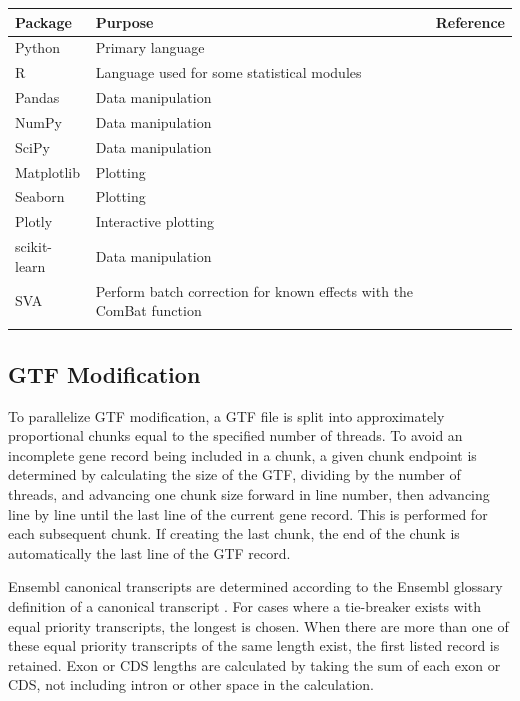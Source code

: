 \documentclass[10pt, oneside]{article}
\begin{document}
\begin{table}[!]
    \centering
{}
\begin{tabular}{p{2.4cm}p{7.5cm}p{3cm}}
 \textbf{Package} & \textbf{Purpose} & \textbf{Reference} \\
 \hline
 Python & Primary language & \\
 \hline
 R & Language used for some statistical modules & \\
 \hline
 Pandas & Data manipulation & \cite{pandas} \\
 \hline
 NumPy & Data manipulation & \cite{numpy1, numpy2} \\
 \hline
 SciPy & Data manipulation & \cite{scipy} \\
 \hline
 Matplotlib & Plotting & \cite{matplotlib} \\
 \hline
 Seaborn & Plotting & \cite{seaborn} \\
 \hline
 Plotly & Interactive plotting & \cite{plotly} \\
 \hline
 scikit-learn & Data manipulation & \cite{sklearn} \\
 \hline
 SVA & Perform batch correction for known effects with the ComBat function & \cite{sva} \\
 \label{Tab:software_plot}
 \end{tabular}
\end{table}

\subsection{GTF Modification}
To parallelize GTF modification, a GTF file is split into approximately proportional chunks equal to the specified number of threads. To avoid an incomplete gene record being included in a chunk, a given chunk endpoint is determined by calculating the size of the GTF, dividing by the number of threads, and advancing one chunk size forward in line number, then advancing line by line until the last line of the current gene record. This is performed for each subsequent chunk. If creating the last chunk, the end of the chunk is automatically the last line of the GTF record. \par

Ensembl canonical transcripts are determined according to the Ensembl glossary definition of a canonical transcript \cite{ensembl_canon}. For cases where a tie-breaker exists with equal priority transcripts, the longest is chosen. When there are more than one of these equal priority transcripts of the same length exist, the first listed record is retained. Exon or CDS lengths are calculated by taking the sum of each exon or CDS, not including intron or other space in the calculation. \par
\end{document}
